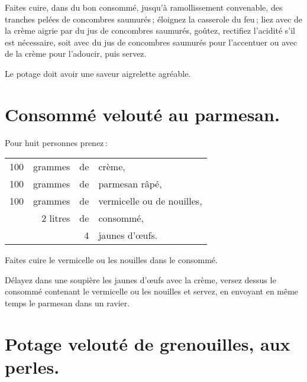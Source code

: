 Faites cuire, dans du bon consommé, jusqu'à ramollissement convenable, des
tranches pelées de concombres saumurés ; éloignez la casserole du feu ; liez
avec de la crème aigrie par du jus de concombres saumurés, goûtez, rectifiez
l'acidité s'il est nécessaire, soit avec du jus de concombres saumurés pour
l'accentuer ou avec de la crème pour l'adoucir, puis servez.

Le potage doit avoir une saveur aigrelette agréable.

\section*{\centering Consommé velouté au parmesan.}

\medskip

Pour huit personnes prenez :

\medskip

\footnotesize
\begin{longtable}{rrrp{16em}}                                                    
    100 & grammes  & de & crème,                                                                          \\
    100 & grammes  & de & parmesan râpé,                                                                  \\
    100 & grammes  & de & vermicelle ou de nouilles,                                                      \\
        & 2 litres & de & consommé,                                                                       \\
        &          &  4 & jaunes d'œufs.                                                                  \\
\end{longtable}
\normalsize

Faites cuire le vermicelle ou les nouilles dans le consommé.

Délayez dans une soupière les jaunes d'œufs avec la crème, versez dessus le
consommé contenant le vermicelle ou les nouilles et servez, en envoyant en même
temps le parmesan dans un ravier.

\section*{\centering Potage velouté de grenouilles, aux perles.}
\label{pg0221} \hypertarget{p0221}{}

